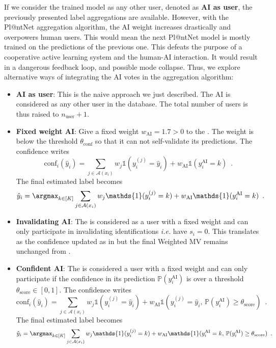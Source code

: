 If we consider the trained model as any other user, denoted as \textbf{AI as user}, the previously presented label aggregations are available.
However, with the Pl@ntNet aggregation algorithm, the AI weight increases drastically and overpowers human users.
This would mean the next Pl@ntNet model is mostly trained on the predictions of the previous one.
This defeats the purpose of a cooperative active learning system and the human-AI interaction. It would result in a dangerous feedback loop, and possible mode collapse.
Thus, we explore alternative ways of integrating the AI votes in the aggregation algorithm:
\begin{itemize}
    \item \textbf{AI as user}: This is the naive approach we just described. The AI is considered as any other user in the database. The total number of users is thus raised to $n_{\text{user}}+1$.
    \item \textbf{Fixed weight AI}: Give a fixed weight $w_{\text{AI}}=1.7>0$ to the . The weight is below the threshold $\theta_{\text{conf}}$ so that it can not self-validate its predictions. The confidence writes
    \begin{equation}\label{eq:confweight}\mathrm{conf}_i(\hat y_i) = \sum_{j\in\mathcal{A}(x_i)} w_j\mathds{1}(y_i^{(j)}=\hat y_i)+ w_{\text{AI}}\mathds{1}(y_i^{\text{AI}}=k)\enspace.
    \end{equation} The final estimated label becomes
    \begin{equation}\label{eq:wmvAI}\hat y_i = \argmax_{k\in [K]} \sum_{j\in \mathcal{A}(x_i)} w_j \mathds{1}(y_i^{(j)}=k) + w_{\text{AI}}\mathds{1}(y_i^{\text{AI}}=k)\enspace.
    \end{equation}
    \item \textbf{Invalidating AI}: The  is considered as a user with a fixed weight and can only participate in invalidating identifications \emph{i.e.} have $s_i=0$. This translates as the confidence updated as in  but the final Weighted MV remains unchanged from .
    \item \textbf{Confident AI}: The  is considered a user with a fixed weight and can only participate if the confidence in its prediction $\mathbb{P}(y_i^{\text{AI}})$ is over a threshold $\theta_{\text{score}}\in [0,1]$.
    The confidence writes
    \begin{equation}\mathrm{conf}_i(\hat y_i) = \sum_{j\in\mathcal{A}(x_i)} w_j\mathds{1}(y_i^{(j)}=\hat y_i) + w_{\text{AI}}\mathds{1}(y_i^{(j)}=\hat y_i,\,\mathbb{P}(y_i^{\text{AI}})\geq\theta_{\text{score}})\enspace. \end{equation} The final estimated label becomes
\begin{equation}\hat y_i = \argmax_{k\in [K]} \sum_{j\in \mathcal{A}(x_i)} w_j \mathds{1}(y_i^{(j)}=k) + w_{\text{AI}}\mathds{1}(y_i^{\text{AI}}=k,\,\mathbb{P}(y_i^{\text{AI}})\geq\theta_{\text{score}})\enspace.\end{equation}
\end{itemize}

